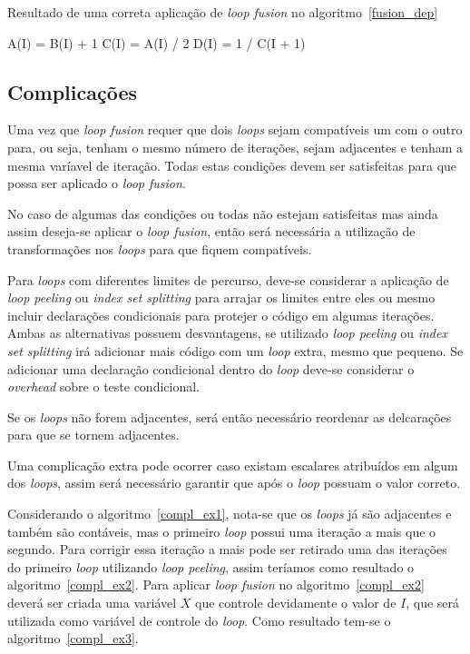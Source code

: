 \begin{algorithm}
\caption{Resultado de uma correta aplicação de \textit{loop fusion} no 
        algoritmo~\ref{fusion_dep}} 
\label{fusion_dep3}
\begin{algorithmic}[1]

\STATE A(I) = B(I) + 1
\STATE C(I) = A(I) / 2
\ENDFOR
{}
\STATE D(I) = 1 / C(I + 1)
\ENDFOR

\end{algorithmic}
\end{algorithm}


\subsection{Complicações}

Uma vez que \textit{loop fusion} requer que dois \textit{loops} sejam
compatíveis um com o outro para, ou seja, tenham o mesmo número de iterações,
sejam adjacentes e tenham a mesma varíavel de iteração.
Todas estas condições devem ser satisfeitas para que possa ser aplicado o
\textit{loop fusion}.

No caso de algumas das condições ou todas não estejam satisfeitas mas ainda
assim deseja-se aplicar o \textit{loop fusion}, então será necessária a
utilização de transformações nos \textit{loops} para que fiquem compatíveis.

Para \textit{loops} com diferentes limites de percurso, deve-se considerar a
aplicação de \textit{loop peeling} ou \textit{index set splitting} para arrajar
os limites entre eles ou mesmo incluir declarações condicionais para protejer o
código em algumas iterações.
Ambas as alternativas possuem desvantagens, se utilizado \textit{loop peeling}
ou \textit{index set splitting} irá adicionar mais código com um \textit{loop}
extra, mesmo que pequeno. Se adicionar uma declaração condicional dentro do
\textit{loop} deve-se considerar o \textit{overhead} sobre o teste condicional.

Se os \textit{loops} não forem adjacentes, será então necessário reordenar as
delcarações para que se tornem adjacentes.

Uma complicação extra pode ocorrer caso existam escalares atribuídos em algum
dos \textit{loops}, assim será necessário garantir que após o \textit{loop}
possuam o valor correto.

Considerando o algoritmo~\ref{compl_ex1}, nota-se que os \textit{loops} já são
adjacentes e também são contáveis, mas o primeiro \textit{loop} possui uma
iteração a mais que o segundo. Para corrigir essa iteração a mais pode ser
retirado uma das iterações do primeiro \textit{loop} utilizando 
\textit{loop peeling}, assim teríamos como resultado o algoritmo~\ref{compl_ex2}. 
Para aplicar \textit{loop fusion} no algoritmo~\ref{compl_ex2} deverá ser
criada uma variável $X$ que controle devidamente o valor de $I$, que será utilizada
como variável de controle do \textit{loop}. Como resultado tem-se o
algoritmo~\ref{compl_ex3}.

